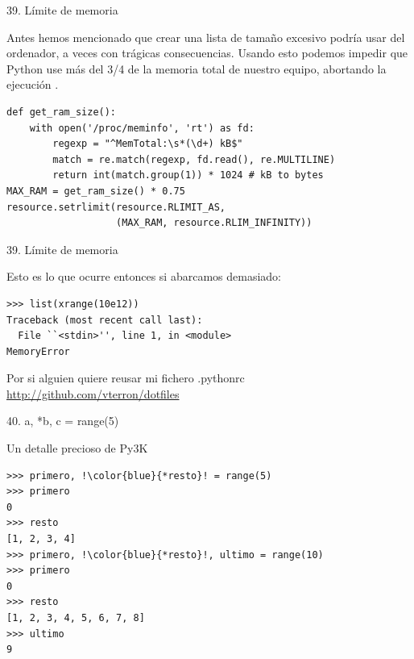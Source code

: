 \documentclass[14pt]{beamer}
\begin{document}
\begin{frame}[fragile]{39. Límite de memoria}
  \small
  \begin{block}{}
    \centering
    Antes hemos mencionado que crear una lista de tamaño excesivo
    podría usar  del ordenador, a veces con
    trágicas consecuencias. Usando esto podemos impedir que Python use
    más del 3/4 de la memoria total de nuestro equipo, abortando la
    ejecución .
  \end{block}

  \scriptsize
  \begin{exampleblock}{}
    \begin{lstlisting}
def get_ram_size():
    with open('/proc/meminfo', 'rt') as fd:
        regexp = "^MemTotal:\s*(\d+) kB$"
        match = re.match(regexp, fd.read(), re.MULTILINE)
        return int(match.group(1)) * 1024 # kB to bytes
MAX_RAM = get_ram_size() * 0.75
resource.setrlimit(resource.RLIMIT_AS,
                   (MAX_RAM, resource.RLIM_INFINITY))
    \end{lstlisting}
  \end{exampleblock}
\end{frame}

\begin{frame}[fragile]{39. Límite de memoria}
  \footnotesize
  \begin{exampleblock}
    {Esto es lo que ocurre entonces si abarcamos demasiado:}
    \begin{lstlisting}
>>> list(xrange(10e12))
Traceback (most recent call last):
  File ``<stdin>'', line 1, in <module>
MemoryError
    \end{lstlisting}
  \end{exampleblock}

  \small
  \begin{block}
    {\centering Por si alguien quiere reusar mi fichero .pythonrc}
    \centering \url{http://github.com/vterron/dotfiles}
  \end{block}
\end{frame}

\begin{frame}[fragile]{40. a, *b, c = range(5)}
  \begin{exampleblock}
    {\centering Un detalle precioso de Py3K}
    \small
    \begin{lstlisting}[escapechar=!]
>>> primero, !\color{blue}{*resto}! = range(5)
>>> primero
0
>>> resto
[1, 2, 3, 4]
>>> primero, !\color{blue}{*resto}!, ultimo = range(10)
>>> primero
0
>>> resto
[1, 2, 3, 4, 5, 6, 7, 8]
>>> ultimo
9
    \end{lstlisting}
  \end{exampleblock}
\end{frame}
\end{document}
